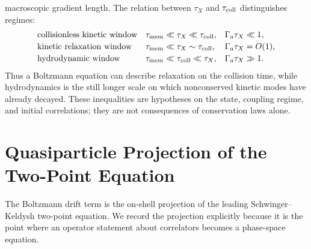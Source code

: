 macroscopic gradient length.  The relation between \(\tau_X\) and
\(\tau_{\rm coll}\) distinguishes regimes:
\[
\begin{array}{lll}
\text{collisionless kinetic window} &
  \tau_{\rm mem}\ll \tau_X\ll\tau_{\rm coll},
  & \Gamma_a\tau_X\ll1,\\[2pt]
\text{kinetic relaxation window} &
  \tau_{\rm mem}\ll \tau_X\sim\tau_{\rm coll},
  & \Gamma_a\tau_X=O(1),\\[2pt]
\text{hydrodynamic window} &
  \tau_{\rm mem}\ll\tau_{\rm coll}\ll\tau_X,
  & \Gamma_a\tau_X\gg1 .
\end{array}
\]
Thus a Boltzmann equation can describe relaxation on the collision time, while
hydrodynamics is the still longer scale on which nonconserved kinetic modes
have already decayed.  These inequalities are hypotheses on the state,
coupling regime, and initial correlations; they are not consequences of
conservation laws alone.

\section{Quasiparticle Projection of the Two-Point Equation}
\label{sec:kinetic-quasiparticle-projection-two-point-equation}

The Boltzmann drift term is the on-shell projection of the leading
Schwinger--Keldysh two-point equation.  We record the projection explicitly
because it is the point where an operator statement about correlators becomes
a phase-space equation.

